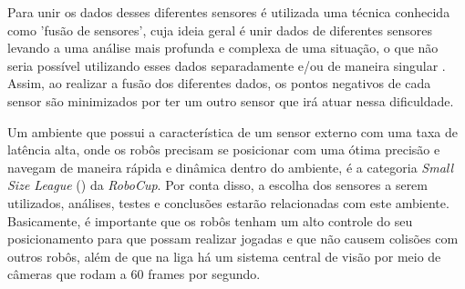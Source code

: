 \documentclass[acronym, symbols, table]{fei}
\begin{document}
	Para unir os dados desses diferentes sensores é utilizada uma técnica conhecida como 'fusão de sensores', cuja ideia geral é unir dados de diferentes sensores levando a uma análise mais profunda e complexa de uma situação, o que não seria possível utilizando esses dados separadamente e/ou de maneira singular \cite{s16101569}. Assim, ao realizar a fusão dos diferentes dados, os pontos negativos de cada sensor são minimizados por ter um outro sensor que irá atuar nessa dificuldade.
	
	Um ambiente que possui a característica de um sensor externo com uma taxa de latência alta, onde os robôs precisam se posicionar com uma ótima precisão e navegam de maneira rápida e dinâmica dentro do ambiente, é a categoria \textit{Small Size League} () da \textit{RoboCup}. Por conta disso, a escolha dos sensores a serem utilizados, análises, testes e conclusões estarão relacionadas com este ambiente. Basicamente, é importante que os robôs tenham um alto controle do seu posicionamento para que possam realizar jogadas e que não causem colisões com outros robôs, além de que na liga há um sistema central de visão por meio de câmeras que rodam a 60 frames por segundo.

%	
	

%	
	
\end{document}
